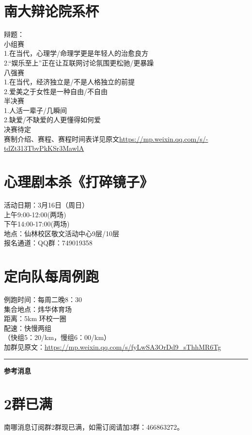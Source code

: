 \documentclass[letterpaper, 12pt]{article}
\begin{document}
\begin{multicols}{2}
\section{南大辩论院系杯}
辩题：\\
小组赛\\
1.在当代，心理学/命理学更是年轻人的治愈良方\\
2.“娱乐至上”正在让互联网讨论氛围更松驰/更暴躁\\
八强赛\\
1.在当代，经济独立是/不是人格独立的前提\\
2.爱美之于女性是一种自由/不自由\\
半决赛\\
1.人活一辈子/几瞬间\\
2.缺爱/不缺爱的人更懂得如何爱\\
决赛待定\\
赛制介绍、赛程、赛程时间表详见原文\url{https://mp.weixin.qq.com/s/-tdZt313TbvPkKSr3MawlA}

\section{心理剧本杀《打碎镜子》}
活动日期：3月16日（周日）\\
上午9:00-12:00(两场)\\
下午14:00-17:00(两场)\\
地点：仙林校区敬文活动中心9层/10层\\
报名通道：QQ群：749019358

\section{定向队每周例跑}
例跑时间：每周二晚8：30\\
集合地点：炜华体育场\\
距离：5km 环校一圈\\
配速：快慢两组\\
（快组5：20/km，慢组6：00/km）\\
加群见原文：\url{https://mp.weixin.qq.com/s/fyLwSA3OrDd9_sThhMR6Tg}


\end{multicols} 
\hrule
\vspace{4mm}
\centerline{\huge\textbf{参考消息}}
\begin{multicols}{2}
\section{2群已满}
南哪消息订阅群2群现已满，如需订阅请加3群：466863272。
\section{}

\end{multicols} 
\end{document}
